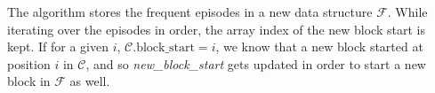 The algorithm stores the frequent episodes in a new data structure $ \mathcal{F} $. While iterating over the episodes in order, the array index of the new block start is kept. If for a given $ i $, $ \mathcal{C}. \text{block\_start} = i $, we know that a new block started at position $ i $ in $ \mathcal{C} $, and so \emph{new\_block\_start} gets updated in order to start a new block in $ \mathcal{F} $ as well.
